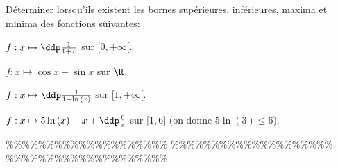 



\begin{exercice}  \;
D\'eterminer lorsqu'ils existent les bornes sup\'erieures, inf\'erieures, maxima et minima des fonctions suivantes:
\begin{enumerate}
\begin{minipage}[t]{0.4\textwidth}
\item $f: x\mapsto \ddp\frac{1}{1+x}  $ sur $\lbrack 0,+\infty\lbrack$.
\item $f: x\mapsto \cos{x}+\sin{x}$ sur $\R$.
\end{minipage}
\begin{minipage}[t]{0.5\textwidth}
\item $f: x\mapsto \ddp\frac{1}{1+\ln{(x)}}$ sur $\lbrack 1,+\infty\lbrack$. 
\item $f: x\mapsto 5\ln{(x)}-x+\ddp\frac{6}{x}$ sur $\lbrack 1,6\rbrack$ (on donne $5\ln{(3)}\leq 6$).
\end{minipage}
\end{enumerate}
\end{exercice}


\%\%\%\%\%\%\%\%\%\%\%\%\%\%\%\%\%\%\%\%
\%\%\%\%\%\%\%\%\%\%\%\%\%\%\%\%\%\%\%\%
\%\%\%\%\%\%\%\%\%\%\%\%\%\%\%\%\%\%\%\%




